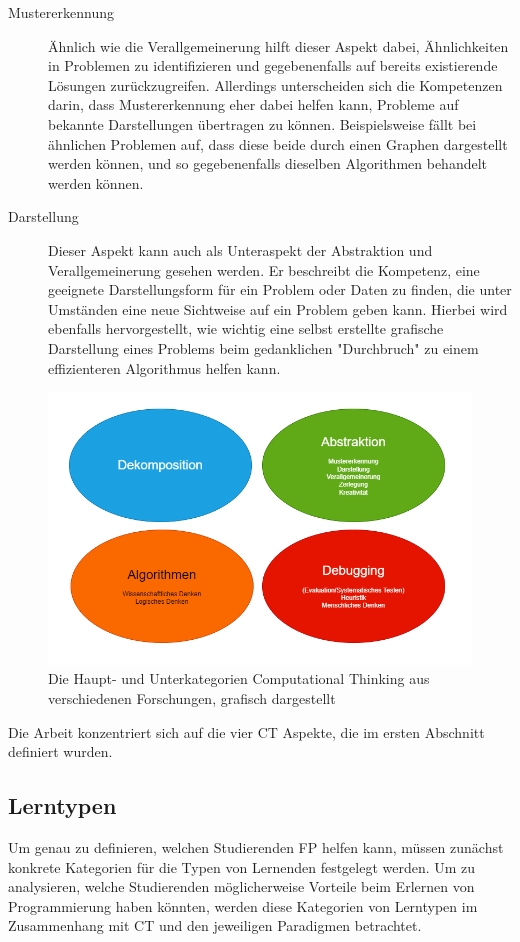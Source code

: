 \begin{description}
    \item[Mustererkennung] Ähnlich wie die Verallgemeinerung hilft dieser Aspekt dabei, Ähnlichkeiten in Problemen zu identifizieren und gegebenenfalls auf bereits existierende Lösungen zurückzugreifen. Allerdings unterscheiden sich die Kompetenzen darin, dass Mustererkennung eher dabei helfen kann, Probleme auf bekannte Darstellungen übertragen zu können. Beispielsweise fällt bei ähnlichen Problemen auf, dass diese beide durch einen Graphen dargestellt werden können, und so gegebenenfalls dieselben Algorithmen behandelt werden können.
    \item[Darstellung] Dieser Aspekt kann auch als Unteraspekt der Abstraktion und Verallgemeinerung gesehen werden. Er beschreibt die Kompetenz, eine geeignete Darstellungsform für ein Problem oder Daten zu finden, die unter Umständen eine neue Sichtweise auf ein Problem geben kann. Hierbei wird ebenfalls hervorgestellt, wie wichtig eine selbst erstellte grafische Darstellung eines Problems beim gedanklichen "Durchbruch" zu einem effizienteren Algorithmus helfen kann.
\end{description}

\begin{figure}[H]
    \centering
    \includegraphics[width=1\linewidth]{Figures/Section_2/CT}
    \caption{Die Haupt- und Unterkategorien Computational Thinking aus verschiedenen Forschungen, grafisch dargestellt}
\end{figure}

Die Arbeit konzentriert sich auf die vier CT Aspekte, die im ersten Abschnitt definiert wurden.

\subsection{Lerntypen}
Um genau zu definieren, welchen Studierenden FP helfen kann, müssen zunächst konkrete Kategorien für die Typen von Lernenden festgelegt werden. Um zu analysieren, welche Studierenden möglicherweise Vorteile beim Erlernen von Programmierung haben könnten, werden diese Kategorien von Lerntypen im Zusammenhang mit CT und den jeweiligen Paradigmen betrachtet.

